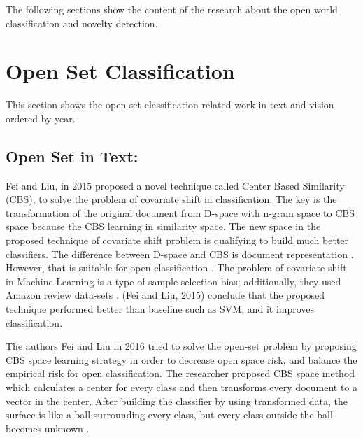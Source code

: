 \documentclass[conference]{IEEEtran}
\begin{document}

The following sections show the content of the research about the open world classification and novelty detection. 


\section{Open Set Classification}

This section shows the open set classification related work in text and vision ordered by year. 

\subsection{ Open Set in Text:}


 \par Fei and Liu, in 2015 proposed a novel technique called Center Based Similarity (CBS), to solve the problem of covariate shift in classification. The key is the transformation of the original document from D-space with n-gram space to CBS space because the CBS learning in similarity space. The new space in the proposed technique of covariate shift problem is qualifying to build much better classifiers. The difference between D-space and CBS is document representation \cite{fei2015social}. However, that is suitable for open classification \cite{fei2016breaking}.  The problem of covariate shift in Machine Learning is a type of sample selection bias; additionally, they used Amazon review data-sets \cite{jindal2008opinion}.  (Fei and Liu, 2015) conclude that the proposed technique performed better than baseline such as SVM, and it improves classification\cite{fei2015social}.




\par The authors Fei and Liu in 2016 tried to solve the open-set problem by proposing CBS space learning strategy in order to decrease open space risk, and balance the empirical risk for open classification. The researcher proposed CBS space method which calculates a center for every class and then transforms every document to a vector in the center. After building the classifier by using transformed data, the surface is like a ball surrounding every class, but every class outside the ball becomes unknown \cite{fei2016breaking}. 
\end{document}

